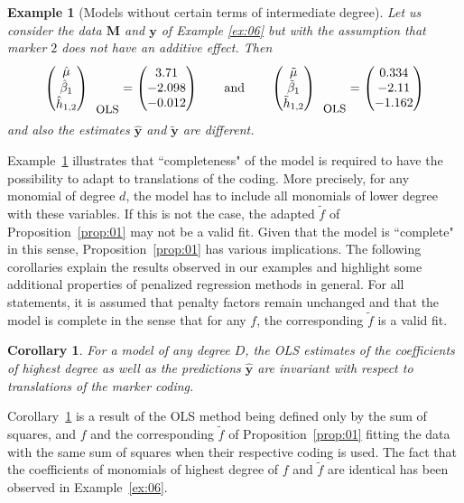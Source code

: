 \documentclass{bmcart}
\newtheorem{example}{Example}
\newtheorem{corollary}{Corollary}
\newcommand{\M}{\mathbf{M}}
\newcommand{\0}{\mathbf{0}}
\newcommand{\y}{\mathbf{y}}
\begin{document}
\begin{example}[Models without certain terms of intermediate degree]\label{ex:07}
	Let us consider the data $\M$ and $\y$ of Example \ref{ex:06} but with the assumption that marker $2$ does not have an additive effect. Then
	$$\begin{pmatrix}
	\hat{\mu} \\
	\hat{\beta}_1 \\
	\hat{h}_{1,2}
	\end{pmatrix}_{\mbox{\small OLS}} = \begin{pmatrix}
	3.71 \\
	-2.098\\
	-0.012\\
	\end{pmatrix}
	\qquad \mbox{and} \qquad \begin{pmatrix}
	\tilde{\mu} \\
	\tilde{\beta}_1 \\
	\tilde{h}_{1,2}
	\end{pmatrix}_{\mbox{\small OLS}}= \begin{pmatrix}
	0.334\\
	-2.11 \\
	-1.162
	\end{pmatrix} $$
	and also the estimates $\hat{\y}$ and $\tilde{\y}$ are different. 
\end{example}
Example~\ref{ex:07} illustrates that ``completeness" of the model is required to have the possibility to adapt to translations of the coding. 
More precisely, for any monomial of degree $d$, the model has to include all monomials of lower degree with these variables. If this is not the case, the adapted $\tilde{f}$ of Proposition~\ref{prop:01} may not be a valid fit. Given that the model is ``complete" in this sense, Proposition~\ref{prop:01} has various implications.
The following corollaries explain the results observed in our examples and highlight some additional properties of penalized regression methods in general.  
For all statements, it is assumed that penalty factors remain unchanged and that the model is complete in the sense that for any $f$, the corresponding $\tilde{f}$ is a valid fit.

\begin{corollary}\label{cor:01}
	For a model of any degree $D$, the OLS estimates of the coefficients of highest degree as well as the predictions $\hat{\y}$ are invariant with respect to translations of the marker coding. 
\end{corollary}
Corollary~\ref{cor:01} is a result of the OLS method being defined only by the sum of squares, and $f$ and the corresponding $\tilde{f}$ of Proposition~\ref{prop:01} fitting the data with the same sum of squares when their respective coding is used. The fact that the coefficients of monomials of highest degree of $f$ and $\tilde{f}$ are identical has been observed in Example~\ref{ex:06}.	
\end{document}
